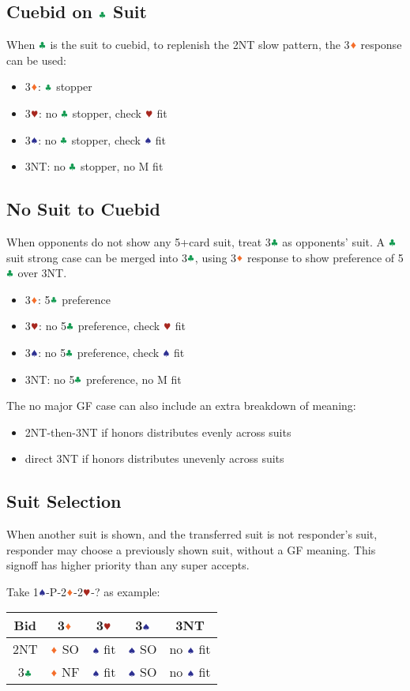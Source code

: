 \documentclass{article}
\newcommand*{\ccc}{\textcolor{ForestGreen}{\clubsuit}}
\newcommand*{\ddd}{\textcolor{Orange}{\vardiamondsuit}}
\newcommand*{\hhh}{\textcolor{Mahogany}{\varheartsuit}}
\newcommand*{\sss}{\textcolor{Blue}{\spadesuit}}
\begin{document}
\begin{multicols}{2}
\subsection{Cuebid on $\ccc$ Suit}
When $\ccc$ is the suit to cuebid, to replenish the 2NT slow pattern, the 3$\ddd$ response can be used:
\begin{itemize}
    \item 3$\ddd$: $\ccc$ stopper
    \item 3$\hhh$: no $\ccc$ stopper, check $\hhh$ fit
    \item 3$\sss$: no $\ccc$ stopper, check $\sss$ fit
    \item 3NT: no $\ccc$ stopper, no M fit
\end{itemize}

\subsection{No Suit to Cuebid}
When opponents do not show any 5+card suit, treat 3$\ccc$ as opponents' suit. A $\ccc$ suit strong case can be merged into 3$\ccc$, using 3$\ddd$ response to show preference of 5$\ccc$ over 3NT.
\begin{itemize}
    \item 3$\ddd$: 5$\ccc$ preference
    \item 3$\hhh$: no 5$\ccc$ preference, check $\hhh$ fit
    \item 3$\sss$: no 5$\ccc$ preference, check $\sss$ fit
    \item 3NT: no 5$\ccc$ preference, no M fit
\end{itemize}

\noindent The no major GF case can also include an extra breakdown of meaning:
\begin{itemize}
    \item 2NT-then-3NT if honors distributes evenly across suits
    \item direct 3NT if honors distributes unevenly across suits
\end{itemize}

\subsection{Suit Selection}
When another suit is shown, and the transferred suit is not responder's suit, responder may choose a previously shown suit, without a GF meaning. This signoff has higher priority than any super accepts.

\noindent Take 1$\sss$-P-2$\ddd$-2$\hhh$-? as example: \\
\begin{tabular}{c|c|c|c|c}
    \hline
    Bid & 3$\ddd$ & 3$\hhh$ & 3$\sss$ & 3NT \\ \hline\hline
    2NT & $\ddd$ SO & $\sss$ fit & $\sss$ SO & no $\sss$ fit \\ \hline
    3$\ccc$ & $\ddd$ NF & $\sss$ fit & $\sss$ SO & no $\sss$ fit \\ \hline
\end{tabular}


\end{multicols}
\end{document}

